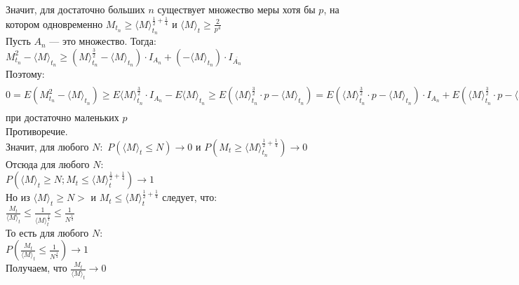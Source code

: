 \documentclass[12pt]{article}
\begin{document}
Значит, для достаточно больших $n$ существует множество меры хотя бы $p$, на котором одновременно
$M_{t_n} \ge \langle M\rangle_{t_n}^{\frac{1}{2} + \frac{1}{4}}$ и
$ \langle M\rangle_t \ge \frac{2}{p^4}$\\

Пусть $A_n$ — это множество.
Тогда:\\
$M_{t_n}^2 -  \langle M\rangle_{t_n} \ge \left(  M\rangle_{t_n}^{\frac{3}{2}} - \langle M\rangle_{t_n} \right) \cdot I_{A_n} + \left(  -  \langle M\rangle_{t_n}\right) \cdot I_{\overline{A_n}}$\\

Поэтому:\\
$0=E\left( M_{t_n}^2 - \langle M\rangle_{t_n} \right)  \ge E  \langle M\rangle_{t_n}^{\frac{3}{2}} \cdot I_{A_n}
 - E \langle M\rangle_{t_n} \geq
 E \left(  \langle M\rangle_{t_n}^{\frac{3}{2}} \cdot p -\langle M\rangle_{t_n} \right)  =
 E \left(  \langle M\rangle_{t_n}^{\frac{3}{2}} \cdot p -\langle M\rangle_{t_n} \right) \cdot I_{A_n} +
 E \left(  \langle M\rangle_{t_n}^{\frac{3}{2}} \cdot p -\langle M\rangle_{t_n} \right) \cdot I_{\overline{A_n}} \ge 
 \left(  p\cdot  \left( \frac{2}{p^4} \right)^{\frac{3}{2}} - \frac{2}{p^4} \right)\cdot p - \frac{2(1-p)}{9p^2}=
 \frac{2\sqrt2}{p^4} - \frac{2}{p^3} - \frac{2}{9p^2} + \frac{2}{9p} > 0$ при достаточно маленьких $p$\\

Противоречие.\\

Значит, для любого $N:$ $P\left( \langle M\rangle_t \leq N \right) \to 0$ и $P\left( M_t  \ge  \langle M\rangle_{t_n}^{\frac{1}{2} + \frac{1}{4}} \right) \to 0$\\
Отсюда для любого $N:$\\
$P\left( \langle M\rangle_t \ge N ; M_t \leq \langle M\rangle_t ^{\frac{1}{2} + \frac{1}{4}}  \right) \to 1$\\



Но из $\langle M\rangle _t  \ge N>$ и $M_t \leq \langle M\rangle_{t}^{\frac{1}{2} + \frac{1}{4}} $ следует, что:\\
$\frac{M_t}{\langle M\rangle_t} \leq \frac{1}{\langle M\rangle_t^{\frac{1}{4}}} \le \frac{1}{N^{\frac{1}{4}}}$\\

То есть для любого $N:$\\
$P\left( \frac{M_t}{\langle M\rangle_t} \le \frac{1}{N^{\frac{1}{4}}} \right) \to 1$\\
Получаем, что $ \frac{M_t}{\langle M\rangle_t} \to 0$
\end{document}
